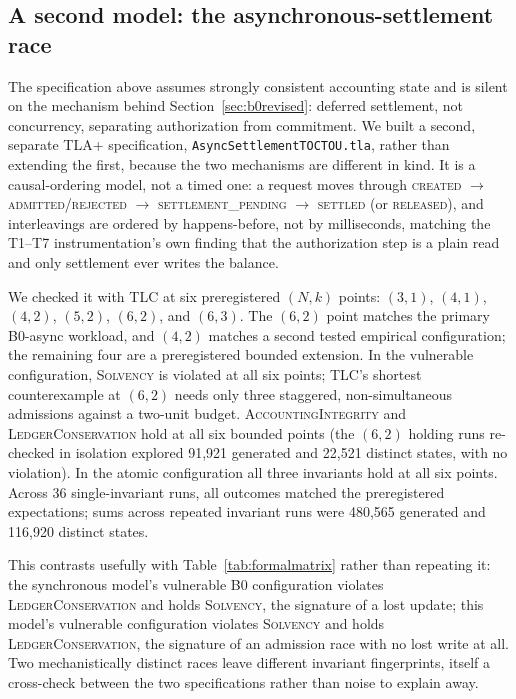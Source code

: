 \documentclass[manuscript,review]{acmart}
\begin{document}
\subsection{A second model: the asynchronous-settlement race}
\label{sec:asyncformal}
The specification above assumes strongly consistent accounting state and is silent on
the mechanism behind Section~\ref{sec:b0revised}: deferred settlement, not concurrency,
separating authorization from commitment. We built a second, separate TLA+
specification, \texttt{AsyncSettlementTOCTOU.tla}, rather than extending the first,
because the two mechanisms are different in kind. It is a causal-ordering model, not a
timed one: a request moves through \textsc{created}
$\to$ \textsc{admitted}/\textsc{rejected} $\to$ \textsc{settlement\_pending} $\to$
\textsc{settled} (or \textsc{released}), and interleavings are ordered by happens-before,
not by milliseconds, matching the T1--T7 instrumentation's own finding that the
authorization step is a plain read and only settlement ever writes the balance.

We checked it with TLC at six preregistered $(N,k)$ points: $(3,1)$, $(4,1)$, $(4,2)$,
$(5,2)$, $(6,2)$, and $(6,3)$. The $(6,2)$ point matches the primary B0-async workload,
and $(4,2)$ matches a second tested empirical configuration; the remaining four are a
preregistered bounded extension. In the vulnerable configuration, \textsc{Solvency} is
violated at all six points; TLC's shortest
counterexample at $(6,2)$ needs only three staggered, non-simultaneous admissions against
a two-unit budget. \textsc{AccountingIntegrity} and \textsc{LedgerConservation} hold at
all six bounded points (the $(6,2)$ holding runs re-checked in isolation explored 91{,}921
generated and 22{,}521 distinct states, with no violation). In the atomic configuration
all three invariants hold at all six points. Across 36 single-invariant runs, all outcomes
matched the preregistered expectations; sums across repeated invariant runs were 480{,}565
generated and 116{,}920 distinct states.

This contrasts usefully with Table~\ref{tab:formalmatrix} rather than repeating it: the
synchronous model's vulnerable B0 configuration violates \textsc{LedgerConservation} and
holds \textsc{Solvency}, the signature of a lost update; this model's vulnerable
configuration violates \textsc{Solvency} and holds \textsc{LedgerConservation}, the
signature of an admission race with no lost write at all. Two mechanistically distinct
races leave different invariant fingerprints, itself a cross-check between the two
specifications rather than noise to explain away.
\end{document}
